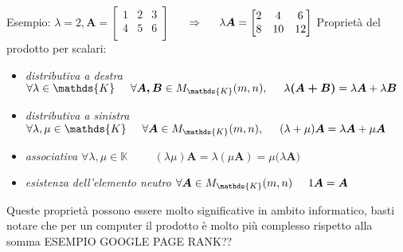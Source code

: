 \documentclass[a4paper, 12pt]{article}
\theoremstyle{definition}
\begin{document}
\noindent Esempio: $\lambda = 2, \boldsymbol{A} = \begin{bmatrix}
    1 & 2 & 3 \\
    4 & 5 & 6 \\
\end{bmatrix} $
$ \hspace{0.5cm} \Rightarrow  \hspace{0.5cm} \lambda\boldsymbol{A} = \begin{bmatrix}
    2 & 4 & 6 \\
    8 & 10 & 12 \\
\end{bmatrix} $
\noindent Proprietà del prodotto per scalari:
\begin{itemize}
    \item \textit{distributiva a destra} \hspace{1.5cm} $\forall{\lambda} \in  \mathds{K} \hspace{0.5cm} \forall{\boldsymbol{A, B}} \in  M_\mathds{K}(m,n), 
    \hspace{0.5cm} \lambda\boldsymbol{(A + B)} = \lambda\boldsymbol{A} + \lambda\boldsymbol{B} $
    \item \textit{distributiva a sinistra} \hspace{1.5cm} $\forall{\lambda, \mu} \in  \mathds{K} \hspace{0.5cm} \forall{\boldsymbol{A}} \in  M_\mathds{K}(m,n), 
    \hspace{0.5cm} (\lambda + \mu)\boldsymbol{A} = \lambda\boldsymbol{A} + \mu\boldsymbol{A} $
    \item \textit{associativa} \hspace{1.5cm} $\forall{\lambda, \mu} \in  \mathds{K} \hspace{1cm }(\lambda\mu)\boldsymbol{A}= \lambda(\mu\boldsymbol{A}) = \mu(\lambda\boldsymbol{A)}$
    \item \textit{esistenza dell'elemento neutro} \hspace{1.5cm} $\forall{\boldsymbol{A}} \in M_\mathds{K}(m,n) \hspace{0.5cm} 1\boldsymbol{A} = \boldsymbol{A}$
\end{itemize}
\noindent Queste proprietà possono essere molto significative in ambito informatico, basti notare che per un computer il prodotto è molto più complesso rispetto alla somma
ESEMPIO GOOGLE PAGE RANK??
\end{document}

